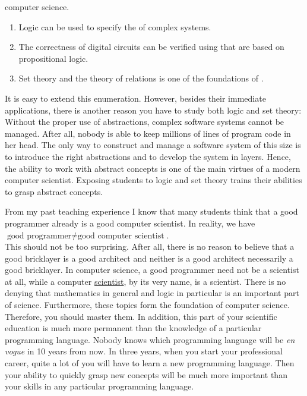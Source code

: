 computer science. 
\begin{enumerate}
\item Logic can be used to specify the  of complex systems.  
\item The correctness of digital circuits can be verified using  that are based on
      propositional logic.
\item Set theory and the theory of relations is one of the foundations of .
\end{enumerate}
It is easy to extend this enumeration.  However, besides their immediate applications, 
there is another reason you have to study both logic and set theory: Without the proper use of
{\color{blue}abstractions}, complex software systems cannot be managed.  After all, nobody is able to keep
millions of lines of program code in her head.  The only way to construct and manage a software system of this
size is to introduce the right abstractions and to develop the system in layers.  Hence, the ability
to work with abstract concepts is one of the main virtues of a modern computer scientist.  
Exposing students to logic and set theory trains their abilities to grasp abstract concepts.

From my past teaching experience I know that many students think that a good programmer already is a
good computer scientist.  In reality, we have
\\[0.2cm]
\hspace*{1.3cm}
$\textrm{good programmer} \not= \textrm{good computer scientist}$.
\\[0.2cm]
This should not be too surprising.  After all, there is no reason to believe that a good bricklayer is a good
architect and neither is a good architect necessarily a good bricklayer.
In computer science, a good programmer need not be a scientist at all, while a {\color{blue}computer
  \underline{scientist}}, by its very name, is a {\color{blue}scientist}.  
There is no denying that {\color{blue}mathematics} in general and 
{\color{blue}logic} in particular is an important part of science.  Furthermore, these topics form the
foundation of computer science.  Therefore, you should master them.  In addition, this
part of your scientific education is much more permanent than the knowledge of a particular programming
language.  Nobody knows which programming language will be \emph{en vogue} in 10 years from now.  In three 
years, when you start your professional career, quite a lot of you will have to learn a new
programming language.   Then your ability to quickly grasp new concepts will be much more important than your
skills in any particular programming language. 

